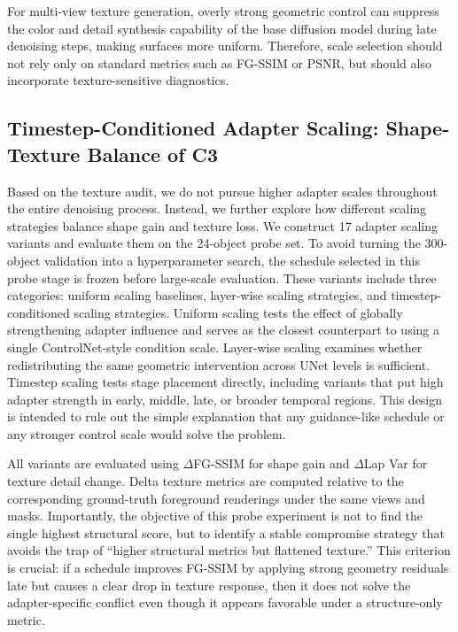 \documentclass[times,twocolumn,final]{elsarticle}
\begin{document}
For multi-view texture generation, overly strong geometric control can suppress the color and detail synthesis capability of the base diffusion model during late denoising steps, making surfaces more uniform. Therefore, scale selection should not rely only on standard metrics such as FG-SSIM or PSNR, but should also incorporate texture-sensitive diagnostics.

\subsection{Timestep-Conditioned Adapter Scaling: Shape-Texture Balance of C3}
\label{subsec:c3}

Based on the texture audit, we do not pursue higher adapter scales throughout the entire denoising process. Instead, we further explore how different scaling strategies balance shape gain and texture loss. We construct 17 adapter scaling variants and evaluate them on the 24-object probe set. To avoid turning the 300-object validation into a hyperparameter search, the schedule selected in this probe stage is frozen before large-scale evaluation. These variants include three categories: uniform scaling baselines, layer-wise scaling strategies, and timestep-conditioned scaling strategies. Uniform scaling tests the effect of globally strengthening adapter influence and serves as the closest counterpart to using a single ControlNet-style condition scale. Layer-wise scaling examines whether redistributing the same geometric intervention across UNet levels is sufficient. Timestep scaling tests stage placement directly, including variants that put high adapter strength in early, middle, late, or broader temporal regions. This design is intended to rule out the simple explanation that any guidance-like schedule or any stronger control scale would solve the problem.

All variants are evaluated using $\Delta$FG-SSIM for shape gain and $\Delta$Lap Var for texture detail change. Delta texture metrics are computed relative to the corresponding ground-truth foreground renderings under the same views and masks. Importantly, the objective of this probe experiment is not to find the single highest structural score, but to identify a stable compromise strategy that avoids the trap of ``higher structural metrics but flattened texture.'' This criterion is crucial: if a schedule improves FG-SSIM by applying strong geometry residuals late but causes a clear drop in texture response, then it does not solve the adapter-specific conflict even though it appears favorable under a structure-only metric.
\end{document}
